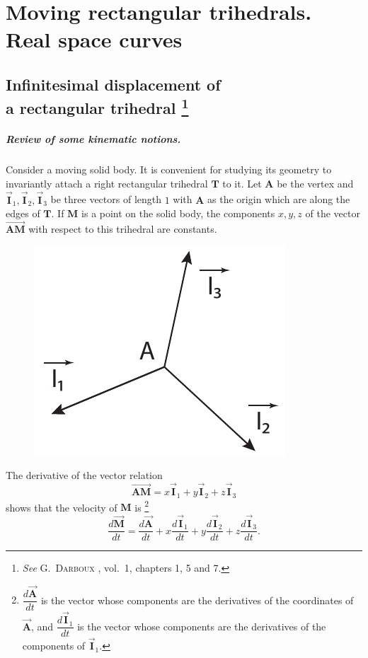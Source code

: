 \documentclass[leqno,11pt]{book}
\numberwithin{equation}{chapter}
\theoremstyle{shape1}
\theoremstyle{shapesmall}
\newcommand{\rvec}[1]{\vec{\mathbf{#1}}}
\newcommand{\ivec}{\rvec{I}}
\begin{document}
\chapter{Moving rectangular trihedrals. Real space curves}
\label{cha:1}


\section[{Infinitesimal displacement of a rectangular trihedral}]{Infinitesimal displacement of\\a rectangular trihedral \footnote{\emph{See} \textsc{G.~Darboux} \cite{1}, vol.\ 1, chapters 1, 5 and 7.}}
\label{sec:1.1}

\paragraph{Review of some kinematic notions.}
\label{sec:2}
Consider a moving solid body. It is convenient for studying its
geometry to invariantly attach a right rectangular trihedral
$\mathbf{T}$ to it. Let $\mathbf{A}$ be the vertex and $\ivec_{1},
\ivec_{2}, \vec{ \mathbf{I}}_{3}$ be three vectors of length $1$ with
$\mathbf{A}$ as the origin which are along the edges of
$\mathbf{T}$. If $\mathbf{M}$ is a point on the solid body, the
components $x, y, z$ of the vector $\overrightarrow{\mathbf{AM}}$ with
respect to this trihedral are constants.

\begin{figure}[h]
  \caption{}
  \centering
  \includegraphics{cartangrp-f1}
\end{figure}

The derivative of the vector relation
\[
\overrightarrow{\mathbf{AM}}=x\vec{ \mathbf{I}}_{1}+y\ivec_{2}+z \ivec_{3}
\]
shows that the velocity of $\mathbf{M}$ is
\footnote{$\dfrac{d{\rvec{A}}}{dt}$ is the vector whose components are
  the derivatives of the coordinates of ${\rvec{A}}$, and
  $\dfrac{d\ivec_{1}}{dt}$ is the vector whose components are the
  derivatives of the components of $\ivec_{1}$.}
\[
\frac{d{\rvec{M}}}{dt}=\frac{d{\rvec{A}}}{dt}+x\frac{d \ivec_{1}}{dt}+y\frac{d\ivec_{2}}{dt}+z\frac{d\ivec_{3}}{dt}.
\]
\end{document}

